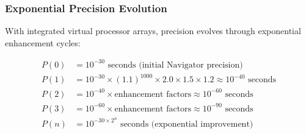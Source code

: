 \documentclass[12pt,a4paper]{article}
\begin{document}
\subsubsection{Exponential Precision Evolution}

With integrated virtual processor arrays, precision evolves through exponential enhancement cycles:

\begin{align}
P(0) &= 10^{-30} \text{ seconds (initial Navigator precision)} \\
P(1) &= 10^{-30} \times (1.1)^{1000} \times 2.0 \times 1.5 \times 1.2 \approx 10^{-40} \text{ seconds} \\
P(2) &= 10^{-40} \times \text{enhancement factors} \approx 10^{-60} \text{ seconds} \\
P(3) &= 10^{-60} \times \text{enhancement factors} \approx 10^{-90} \text{ seconds} \\
P(n) &= 10^{-30 \times 2^n} \text{ seconds (exponential improvement)}
\end{align}
\end{document}
